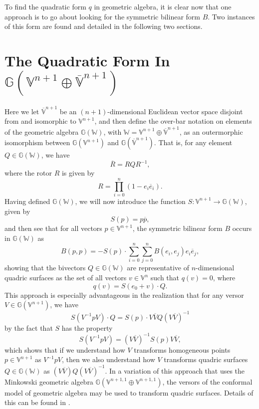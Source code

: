 \documentclass{birkjour}
\theoremstyle{definition}
\theoremstyle{remark}
\numberwithin{equation}{section}
\newcommand{\G}{\mathbb{G}}
\newcommand{\V}{\mathbb{V}}
\newcommand{\Vb}{\mathbb{\overline{V}}}
\newcommand{\W}{\mathbb{W}}
\begin{document}
To find the quadratic form $q$ in geometric algebra, it is clear now that one approach
is to go about looking for the symmetric bilinear form $B$.  Two instances of this form
are found and detailed in the following two sections.

\section{The Quadratic Form In $\G(\V^{n+1}\oplus\Vb^{n+1})$}

Here we let $\Vb^{n+1}$ be an $(n+1)$-dimensional Euclidean vector space
disjoint from and isomorphic to $\V^{n+1}$, and then define the over-bar notation on elements
of the geometric algebra $\G(\W)$, with $\W=\V^{n+1}\oplus\Vb^{n+1}$, as an
outermorphic isomorphism between $\G(\V^{n+1})$ and $\G(\Vb^{n+1})$.
That is, for any element $Q\in\G(\W)$, we have
\begin{equation}
\overline{R} = RQR^{-1},
\end{equation}
where the rotor $R$ is given by
\begin{equation}
R = \prod_{i=0}^n(1-e_i\overline{e}_i).
\end{equation}
Having defined $\G(\W)$, we will now introduce the function $S:\V^{n+1}\to\G(\W)$, given by
\begin{equation}
S(p) = p\overline{p},
\end{equation}
and then see that for all vectors $p\in\V^{n+1}$, the symmetric bilinear
form $B$ occurs in $\G(\W)$ as
\begin{equation}\label{equ_quadric_transformable}
B(p,p) = -S(p)\cdot\sum_{i=0}^n\sum_{j=0}^n B(e_i,e_j)e_i\overline{e}_j,
\end{equation}
showing that the bivectors $Q\in\G(\W)$ are representative of $n$-dimensional
quadric surfaces as the set of all vectors $v\in\V^n$ such that $q(v)=0$, where
\begin{equation}\label{equ_quadric_form_in_ga}
q(v)=S(e_0+v)\cdot Q.
\end{equation}
This approach is especially advantageous in the realization that for
any versor $V\in\G(\V^{n+1})$, we have
\begin{equation}
S(V^{-1}pV)\cdot Q=S(p)\cdot V\overline{V}Q(V\overline{V})^{-1}
\end{equation}
by the fact that $S$ has the property
\begin{equation}
S(V^{-1}pV)=(V\overline{V})^{-1}S(p)V\overline{V},
\end{equation}
which shows that if we understand how $V$ transforms homogeneous
points $p\in\V^{n+1}$ as $V^{-1}pV$, then we also understand
how $V$ transforms quadric surfaces $Q\in\G(\W)$ as $(V\overline{V})Q(V\overline{V})^{-1}$.
In a variation of this approach that uses the Minkowski geometric algebra $\G(\V^{n+1,1}\oplus\V^{n+1,1})$,
the versors of the conformal model of geometric algebra may be used to transform quadric surfaces.
Details of this can be found in \cite{}.
\end{document}
